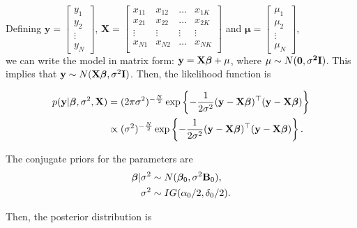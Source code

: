 Defining $\mathbf{y}=\begin{bmatrix} y_1\\ y_2\\ \vdots \\ y_N \end{bmatrix}$, $\mathbf{X}=\begin{bmatrix} x_{11} & x_{12} & \ldots & x_{1K}\\ x_{21} & x_{22} & \ldots & x_{2K}\\ \vdots & \vdots & \vdots & \vdots\\ x_{N1} & x_{N2} & \ldots & x_{NK}\\ \end{bmatrix}$ and $\bm{\mu}=\begin{bmatrix} \mu_1\\ \mu_2\\ \vdots \\ \mu_N \end{bmatrix}$,\\

we can write the model in matrix form: ${\bf{y}}={\bf{X}}\bm{\beta}+\mu$, where $\mu\sim N(\bf{0},\sigma^2{\bf{I}})$. This implies that ${\bf{y}}\sim N({\bf{X}}\bm{\beta},\sigma^2\bf{I})$. Then, the likelihood function is

\begin{align*}
	p({\bf{y}}|\bm{\beta}, \sigma^2, {{\bf{X}}}) & = (2\pi\sigma^2)^{-\frac{N}{2}} \exp \left\{-\frac{1}{2\sigma^2} ({\bf{y}} - {\bf{X}}\bm{\beta})^{\top}({\bf{y}} - {\bf{X}}\bm{\beta}) \right\}  \\
	& \propto (\sigma^2)^{-\frac{N}{2}} \exp \left\{-\frac{1}{2\sigma^2} ({\bf{y}} - {\bf{X}}\bm{\beta})^{\top}({\bf{y}} - {\bf{X}}\bm{\beta}) \right\}.
\end{align*}

The conjugate priors for the parameters are
\begin{align*}
	\bm{\beta}|\sigma^2 & \sim N(\bm{\beta}_0, \sigma^2 {\bf{B}}_0),\\
	\sigma^2 & \sim IG(\alpha_0/2, \delta_0/2).
\end{align*}

Then, the posterior distribution is

